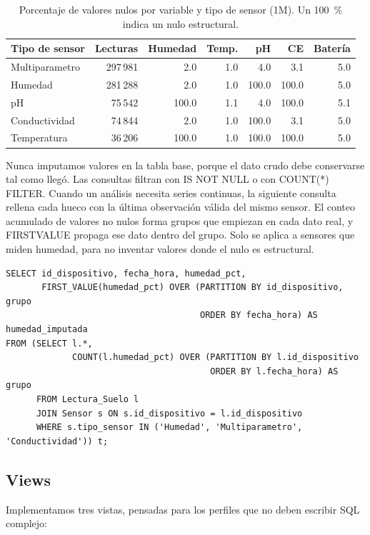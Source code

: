 \documentclass[11pt,letterpaper]{article}
\newcommand{\tbus}{\textunderscore\allowbreak}
\newcommand{\tb}[1]{{\ttfamily\let\_\tbus #1}}
\begin{document}
\begin{table}[H]
\centering\small
\begin{tabular}{lrrrrrr}
\toprule
Tipo de sensor & Lecturas & Humedad & Temp. & pH & CE & Batería \\
\midrule
Multiparametro & 297\,981 & 2.0 & 1.0 & 4.0 & 3.1 & 5.0 \\
Humedad & 281\,288 & 2.0 & 1.0 & 100.0 & 100.0 & 5.0 \\
pH & 75\,542 & 100.0 & 1.1 & 4.0 & 100.0 & 5.1 \\
Conductividad & 74\,844 & 2.0 & 1.0 & 100.0 & 3.1 & 5.0 \\
Temperatura & 36\,206 & 100.0 & 1.0 & 100.0 & 100.0 & 5.0 \\
\bottomrule
\end{tabular}
\caption{Porcentaje de valores nulos por variable y tipo de sensor (1M). Un 100~\% indica un nulo estructural.}\label{tab:nulos}
\end{table}


Nunca imputamos valores en la tabla base, porque el dato crudo debe conservarse tal como llegó. Las consultas filtran con \tb{IS NOT NULL} o con \tb{COUNT(*) FILTER}. Cuando un análisis necesita series continuas, la siguiente consulta rellena cada hueco con la última observación válida del mismo sensor. El conteo acumulado de valores no nulos forma grupos que empiezan en cada dato real, y \tb{FIRST\_VALUE} propaga ese dato dentro del grupo. Solo se aplica a sensores que miden humedad, para no inventar valores donde el nulo es estructural.

\begin{lstlisting}
SELECT id_dispositivo, fecha_hora, humedad_pct,
       FIRST_VALUE(humedad_pct) OVER (PARTITION BY id_dispositivo, grupo
                                      ORDER BY fecha_hora) AS humedad_imputada
FROM (SELECT l.*,
             COUNT(l.humedad_pct) OVER (PARTITION BY l.id_dispositivo
                                        ORDER BY l.fecha_hora) AS grupo
      FROM Lectura_Suelo l
      JOIN Sensor s ON s.id_dispositivo = l.id_dispositivo
      WHERE s.tipo_sensor IN ('Humedad', 'Multiparametro', 'Conductividad')) t;
\end{lstlisting}

\subsection{Views}

Implementamos tres vistas, pensadas para los perfiles que no deben escribir SQL complejo:
\end{document}
